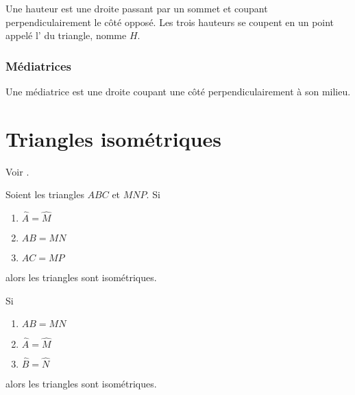 \begin{multicols}{2}
    Une hauteur est une droite passant par un sommet et coupant perpendiculairement le côté opposé. Les trois hauteurs se coupent en un point appelé l' du triangle, nomme \( H\).

    \columnbreak




\end{multicols}


\subsubsection{Médiatrices}

\begin{multicols}{2}
    Une médiatrice est une droite coupant une côté perpendiculairement à son milieu.

    \columnbreak



\end{multicols}



\section{Triangles isométriques}

Voir \cite{TqcjwY}.

\begin{propriete}       \label{PropRtqqxJ}
    Soient les triangles \( ABC\) et \( MNP\). Si
    \begin{enumerate}
        \item
            \( \hat A=\hat M\)
        \item
            \( AB=MN\)
        \item
            \( AC=MP\)
    \end{enumerate}
    alors les triangles sont isométriques.

    Si
    \begin{enumerate}
        \item
            \( AB=MN\)
        \item
            \( \hat A=\hat M\)
        \item
            \( \hat B=\hat N\)
    \end{enumerate}
    alors les triangles sont isométriques.
\end{propriete}
